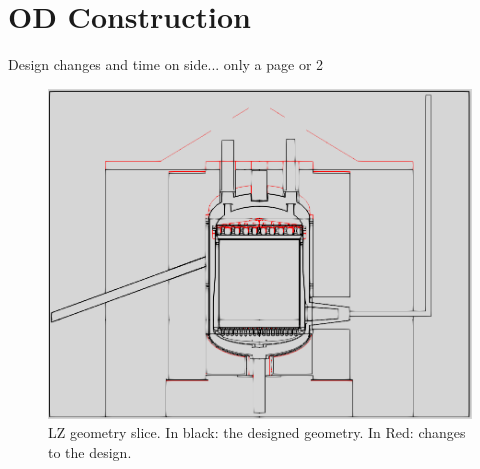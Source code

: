 \section{OD Construction}
\par
Design changes and time on side... only a page or 2


\par
\begin{figure}[!htbp]
\includegraphics[width=\textwidth]{Figures/Construction/geometry_differences.png}
\centering
\caption{LZ geometry slice. In black: the designed geometry. In Red: changes to the design.}
\label{fig:Geometry_Differences}
\end{figure}